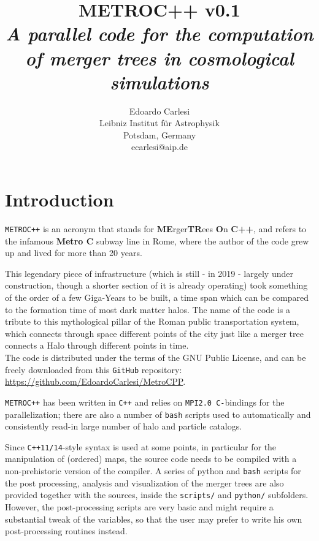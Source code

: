 \documentclass{article}
\title{\textbf{METROC++ v0.1} \\
\emph{A parallel code for the computation of merger trees in 
cosmological simulations}}
\author{Edoardo Carlesi\\ Leibniz Institut f\"ur Astrophysik\\ Potsdam, Germany\\ ecarlesi@aip.de}
\begin{document}
\maketitle
\tableofcontents
\newpage

\section{Introduction}
\texttt{METROC++} is an acronym that stands for \textbf{ME}rger\textbf{TR}ees \textbf{O}n \textbf{C++}, and refers to the 
infamous \textbf{Metro C} subway line in Rome, where the author of the code grew up and lived for more than 20 years.

This legendary piece of infrastructure (which is still - in 2019 - largely under construction, though a shorter section of 
it is already operating) took something of the order of a few Giga-Years to be built, a time span which can be compared to the
formation time of most dark matter halos. The name of the code is a tribute to this mythological pillar of the Roman public
transportation system, which connects through space different points of the city just like a merger tree connects a Halo 
through different points in time.\\

The code is distributed under the terms of the GNU Public License, and can be freely downloaded from 
this \texttt{GitHub} repository: \\

\noindent
\href{https://github.com/EdoardoCarlesi/MetroCPP}{https://github.com/EdoardoCarlesi/MetroCPP}.

\texttt{METROC++} has been written in \texttt{C++} and relies on \texttt{MPI2.0 C-}bindings for the parallelization; there are
also a number of \texttt{bash} scripts used to automatically and consistently read-in large number of halo and particle catalogs.

Since \texttt{C++11/14}-style syntax is used at some points, in particular for the manipulation
of (ordered) maps, the source code needs to be compiled with a non-prehistoric version of the compiler.
A series of python and \texttt{bash} scripts for the post processing, analysis and visualization of the merger trees are also provided 
together with the sources, inside the \texttt{scripts/} and \texttt{python/} subfolders. 
However, the post-processing scripts are very basic and might require a substantial tweak of the variables, so that the user
may prefer to write his own post-processing routines instead.\\
\end{document}
